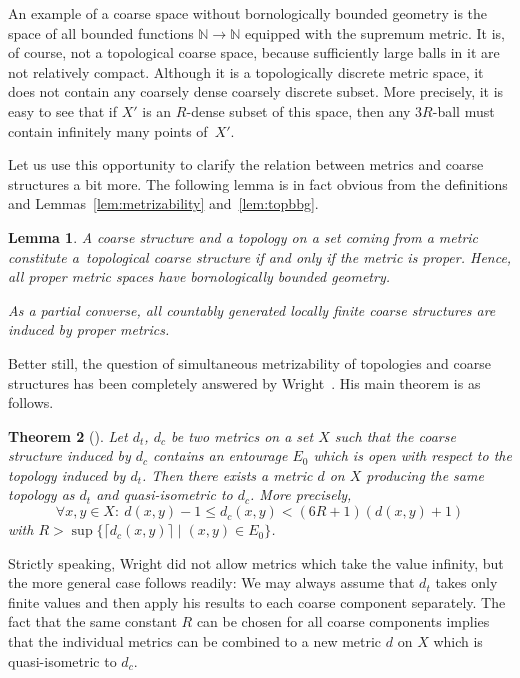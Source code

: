 \documentclass[pdftex]{sigma}
\numberwithin{equation}{section}
\newtheorem{thm}{Theorem}[section]
\newtheorem{lem}[thm]{Lemma}
\theoremstyle{definition}
\newcommand{\N}{\mathbb{N}}
\begin{document}
An example of a coarse space without bornologically bounded geometry is the space of all bounded functions $\N\to\N$ equipped with the supremum metric.
It is, of course, not a topological coarse space, because sufficiently large balls in it are not relatively compact.
Although it is a topologically discrete metric space,
it does not contain any coarsely dense coarsely discrete subset. More precisely, it is easy to see that if $X'$ is an $R$-dense subset of this space, then any $3R$-ball must contain infinitely many points of~$X'$.

Let us use this opportunity to clarify the relation between metrics and coarse structures a bit more. The following lemma is in fact obvious from the definitions and Lemmas~\ref{lem:metrizability} and~\ref{lem:topbbg}.

\begin{lem}%
A coarse structure and a topology on a set coming from a metric constitute a~topological coarse structure if and only if the metric is proper. Hence, all proper metric spaces have bornologically bounded geometry.

As a partial converse, all countably generated locally finite coarse structures are induced by proper metrics.
\end{lem}

Better still, the question of simultaneous metrizability of topologies and coarse structures has been completely answered by Wright~\cite{Wright_Simul}. His main theorem is as follows.

\begin{thm}[{\cite[Theorem 2.5 and its proof]{Wright_Simul}}]\label{thm:Wrightmetrizability}
Let $d_t$, $d_c$ be two metrics on a set $X$ such that the coarse structure induced by $d_c$ contains an entourage $E_0$ which is open with respect to the topology induced by $d_t$. Then there exists a metric $d$ on $X$ producing the same topology as $d_t$ and quasi-isometric to $d_c$. More precisely,
\[
\forall x,y\in X\colon\ d(x,y)-1\leq d_c(x,y)<(6R+1)(d(x,y)+1)
\]
with $R>\sup\{\lceil d_c(x,y)\rceil\mid(x,y)\in E_0\}$.
\end{thm}

Strictly speaking, Wright did not allow metrics which take the value infinity, but the more general case follows readily: We may always assume that $d_t$ takes only finite values and then apply his results to each coarse component separately. The fact that the same constant $R$ can be chosen for all coarse components implies that the individual metrics can be combined to a new metric $d$ on $X$ which is quasi-isometric to $d_c$.
\end{document}
